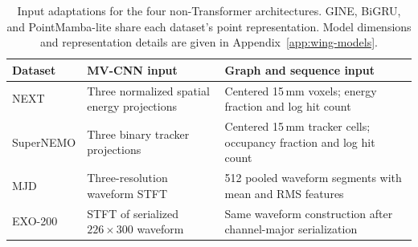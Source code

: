 \begin{table}[t]
\centering
\small
\setlength{\tabcolsep}{4pt}
\caption{Input adaptations for the four non-Transformer architectures. GINE, BiGRU, and PointMamba-lite share each dataset's point representation. Model dimensions and representation details are given in Appendix~\ref{app:wing-models}.}
\label{tab:wing-adaptations}
\begin{tabular}{p{}p{}p{}}
\toprule
Dataset & MV-CNN input & Graph and sequence input \\
\midrule
NEXT & Three normalized spatial energy projections & Centered 15\,mm voxels; energy fraction and log hit count \\
SuperNEMO & Three binary tracker projections & Centered 15\,mm tracker cells; occupancy fraction and log hit count \\
MJD & Three-resolution waveform STFT & 512 pooled waveform segments with mean and RMS features \\
EXO-200 & STFT of serialized $226\!\times\!300$ waveform & Same waveform construction after channel-major serialization \\
\bottomrule
\end{tabular}
\end{table}
